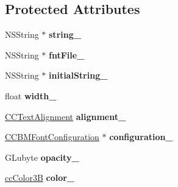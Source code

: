 \subsection*{Protected Attributes}
\begin{DoxyCompactItemize}
\item 
\hypertarget{interface_c_c_label_b_m_font_afb21f90abbb1c53ef24e351ea8d2f7da}{N\-S\-String $\ast$ {\bfseries string\-\_\-}}\label{interface_c_c_label_b_m_font_afb21f90abbb1c53ef24e351ea8d2f7da}

\item 
\hypertarget{interface_c_c_label_b_m_font_a45ec6546095b3a9040a4dbab9d7127e3}{N\-S\-String $\ast$ {\bfseries fnt\-File\-\_\-}}\label{interface_c_c_label_b_m_font_a45ec6546095b3a9040a4dbab9d7127e3}

\item 
\hypertarget{interface_c_c_label_b_m_font_a9946ed2570188d1aac78910aa3f9321e}{N\-S\-String $\ast$ {\bfseries initial\-String\-\_\-}}\label{interface_c_c_label_b_m_font_a9946ed2570188d1aac78910aa3f9321e}

\item 
\hypertarget{interface_c_c_label_b_m_font_aeb7ee7ae558df7de2b0d65bde8db0b7b}{float {\bfseries width\-\_\-}}\label{interface_c_c_label_b_m_font_aeb7ee7ae558df7de2b0d65bde8db0b7b}

\item 
\hypertarget{interface_c_c_label_b_m_font_affcdc9a711d7bce734d04347c713ec8e}{\hyperlink{cc_types_8h_aa56b958f0cc9bdec20a15ed6bea3d0f1}{C\-C\-Text\-Alignment} {\bfseries alignment\-\_\-}}\label{interface_c_c_label_b_m_font_affcdc9a711d7bce734d04347c713ec8e}

\item 
\hypertarget{interface_c_c_label_b_m_font_a724f42683a1f38d84cce6cadef5032ac}{\hyperlink{interface_c_c_b_m_font_configuration}{C\-C\-B\-M\-Font\-Configuration} $\ast$ {\bfseries configuration\-\_\-}}\label{interface_c_c_label_b_m_font_a724f42683a1f38d84cce6cadef5032ac}

\item 
\hypertarget{interface_c_c_label_b_m_font_aa239ea455d82ecb724086fd14b82598e}{G\-Lubyte {\bfseries opacity\-\_\-}}\label{interface_c_c_label_b_m_font_aa239ea455d82ecb724086fd14b82598e}

\item 
\hypertarget{interface_c_c_label_b_m_font_acb94f98b5163a96eefecf9d41a2f0d5e}{\hyperlink{cc_types_8h_a829b00c53e72f0115e3880cb508fec1e}{cc\-Color3\-B} {\bfseries color\-\_\-}}\label{interface_c_c_label_b_m_font_acb94f98b5163a96eefecf9d41a2f0d5e}


\end{DoxyCompactItemize}
